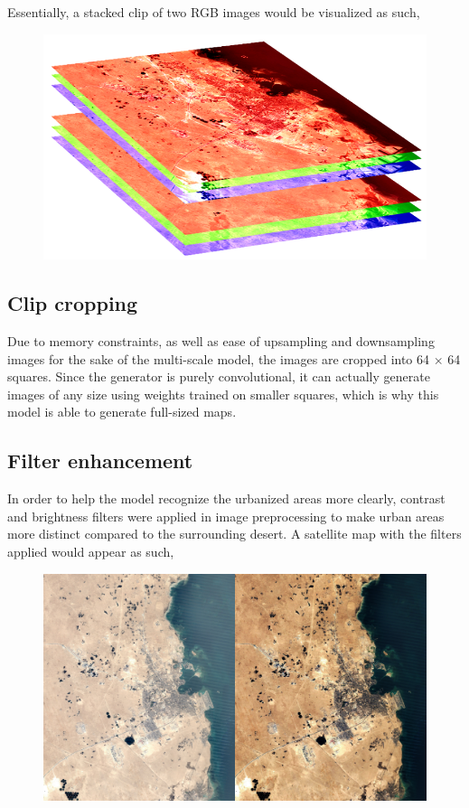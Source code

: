\documentclass{article}
\begin{document}
Essentially, a stacked clip of two RGB images would be visualized as such,

\begin{figure}[H]
    \centering
    \includegraphics[width=0.5\linewidth]{clip-stack.png}
\end{figure}

\subsection{Clip cropping}

Due to memory constraints, as well as ease of upsampling and downsampling images for the sake of the multi-scale model, the images are cropped into 64 $\times$ 64 squares. Since the generator is purely convolutional, it can actually generate images of any size using weights trained on smaller squares, which is why this model is able to generate full-sized maps.

\subsection{Filter enhancement}

In order to help the model recognize the urbanized areas more clearly, contrast and brightness filters were applied in image preprocessing to make urban areas more distinct compared to the surrounding desert. A satellite map with the filters applied would appear as such,

\begin{figure}[H]
    \centering
    \includegraphics[width=0.7\linewidth]{enhanced-comp.png}
\end{figure}
\end{document}
